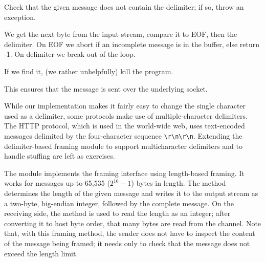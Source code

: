 
\begin{topcode}



\begin{bottomcode}

Check that the given message does not contain the
delimiter; if so, throw an exception.

We get the next byte from the input stream, compare it to EOF, then
the delimiter.  On EOF we abort if an
incomplete message is in the buffer, else return -1. On delimiter we
break out of the loop.

\end{bottomcode}


\begin{bottomcode}

If we find it, (we rather unhelpfully) kill the program.



This ensures that the message is sent over the underlying socket.
\end{bottomcode}

\end{topcode}

While our implementation makes it fairly easy to change the single
character used as a delimiter,
some protocols make use of multiple-character delimiters.
The HTTP protocol, which is used in the world-wide web, uses
text-encoded messages delimited by the four-character sequence
\verb+\r\n\r\n+.
Extending the delimiter-based framing module to support multicharacter
delimiters and to handle stuffing are left as exercises.

The module  implements the framing interface
using length-based framing.  It works for messages up to 65,535
($2^{16}-1$) bytes in length.  The  method
determines the length of the given message and writes it to the output
stream as a two-byte, big-endian integer, followed by the complete
message.  On the receiving side, the  method is used
to read the length as an integer; after converting it to host byte
order, that many bytes are read from the channel.
Note that, with this framing method, the
sender does not have to inspect the content of the message being
framed; it needs only to check that the message does not exceed the
length limit.

